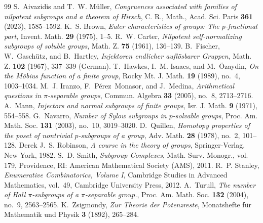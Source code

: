 \documentclass[10pt,a4paper]{amsart}
\numberwithin{equation}{section}
\begin{document}
\begin{thebibliography}{99}
 S.~Aivazidis and T.~W. M{\"u}ller, \emph{Congruences associated with families of nilpotent subgroups and a theorem of {H}irsch}, C. R., Math., Acad. Sci. Paris \textbf{361} (2023), 1585--1592.
 K.~S. Brown, \emph{Euler characteristics of groups: {The} {{\(p\)}}-fractional part}, Invent. Math. \textbf{29} (1975), 1--5.
 R.~W. Carter, \emph{Nilpotent self-normalizing subgroups of soluble groups}, Math. Z. \textbf{75} (1961), 136--139.
 B.~Fischer, W.~Gasch{\"u}tz, and B.~Hartley, \emph{Injektoren endlicher aufl{\"o}sbarer {Gruppen}}, Math. Z. \textbf{102} (1967), 337--339 (German).
 T.~Hawkes, I.~M. Isaacs, and M.~{\"O}zaydin, \emph{On the {M{\"o}bius} function of a finite group}, Rocky Mt. J. Math. \textbf{19} (1989), no.~4, 1003--1034.
 M.~J. Iranzo, F.~P{\'e}rez~Monasor, and J.~Medina, \emph{Arithmetical questions in {{\(\pi\)}}-separable groups}, Commun. Algebra \textbf{33} (2005), no.~8, 2713--2716.
 A.~Mann, \emph{Injectors and normal subgroups of finite groups}, Isr. J. Math. \textbf{9} (1971), 554--558.
 G.~Navarro, \emph{Number of {Sylow} subgroups in {{\(p\)}}-solvable groups}, Proc. Am. Math. Soc. \textbf{131} (2003), no.~10, 3019--3020.
 D.~Quillen, \emph{Homotopy properties of the poset of nontrivial {$p$}-subgroups of a group}, Adv. Math. \textbf{28} (1978), no.~2, 101--128.
 Derek J.~S. Robinson, \emph{A course in the theory of groups}, Springer-Verlag, New York, 1982.
 S.~D. Smith, \emph{Subgroup {C}omplexes}, Math. Surv. Monogr., vol. 179, Providence, RI: American Mathematical Society (AMS), 2011.
 R.~P. Stanley, \emph{Enumerative {C}ombinatorics, {V}olume {I}}, Cambridge Studies in Advanced Mathematics, vol.~49, Cambridge University Press, 2012.
 A.~Turull, \emph{The number of {Hall} {{\(\pi\)}}-subgroups of a {{\(\pi\)}}-separable group.}, Proc. Am. Math. Soc. \textbf{132} (2004), no.~9, 2563--2565.
 K.~Zsigmondy, \emph{Zur {T}heorie der {P}otenzreste}, Monatshefte f{\"u}r Mathematik und Physik \textbf{3} (1892), 265--284.
\end{thebibliography}
\end{document}
